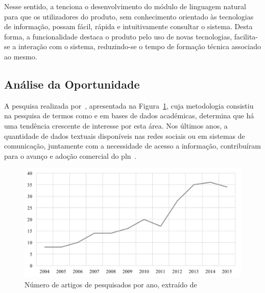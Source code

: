Nesse sentido, a {\companyname} tenciona o desenvolvimento do módulo de linguagem natural para que os utilizadores do produto, sem conhecimento orientado às tecnologias de informação, possam fácil, rápida e intuitivamente consultar o sistema. Desta forma, a funcionalidade destaca o produto pelo uso de novas tecnologias, facilita-se a interação com o sistema, reduzindo-se o tempo de formação técnica associado ao mesmo. 

\subsection{Análise da Oportunidade}
A pesquisa realizada por~\textcite{roadmap_nlp_research_is}, apresentada na Figura~\ref{fig:number_articles_per_year_nlp}, cuja metodologia consistiu na pesquisa de termos como  e  em bases de dados académicas, determina que há uma tendência crescente de interesse por esta área. Nos últimos anos, a quantidade de dados textuais disponíveis nas redes sociais ou em sistemas de comunicação, juntamente com a necessidade de acesso a informação, contribuíram para o avanço e adoção comercial do \gls{pln}~\parencite{roadmap_nlp_research_is}.

\begin{figure}[!ht]
    \centering
    \includegraphics[width=.9\textwidth]{appendices/assets/number_articles_nlp.jpg}
    \caption{Número de artigos de  pesquisados por ano, extraído de~\textcite{roadmap_nlp_research_is}}
    \label{fig:number_articles_per_year_nlp}
\end{figure}

